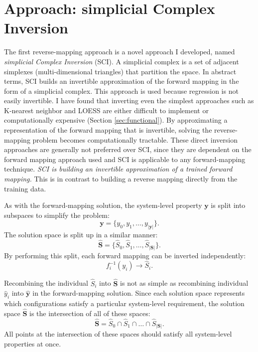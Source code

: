 \section{\fw Approach: simplicial Complex Inversion}
The first \fw reverse-mapping approach is a novel approach I developed, named \textit{simplicial Complex Inversion} (SCI).
A simplicial complex is a set of adjacent simplexes (multi-dimensional triangles) that partition the space.
In abstract terms, SCI builds an invertible approximation of the forward mapping in the form of a simplicial complex.
This approach is used because regression is not easily invertible.
I have found that inverting even the simplest approaches such as K-nearest neighbor and LOESS are either difficult to implement or computationally expensive (Section \ref{sec:functional}).
By approximating a representation of the forward mapping that is invertible, solving the reverse-mapping problem becomes computationally tractable.
These direct inversion approaches are generally not preferred over SCI, since they are dependent on the forward mapping approach used and SCI is applicable to any forward-mapping technique.
\textit{SCI is building an invertible approximation of a trained forward mapping.}
This is in contrast to building a reverse mapping directly from the training data.

As with the forward-mapping solution, the system-level property $\mathbf y$ is split into subspaces to simplify the problem:
\[ \mathbf y = \{y_0, y_1, \ldots, y_{|\mathbf y|}\}. \]
The solution space is split up in a similar manner:
\[ \hat{\mathbf S} = \{\hat S_0, \hat S_1, \ldots, \hat S_{|\mathbf S|}\}. \]
By performing this split, each forward mapping can be inverted independently:
\[ f^{-1}_i(y_i) \rightarrow \hat S_i. \]

Recombining the individual $\hat S_i$ into $\hat{\mathbf S}$ is not as simple as recombining individual $\hat y_i$ into $\hat{\mathbf y}$ in the forward-mapping solution.
Since each solution space represents which configurations satisfy a particular system-level requirement, the solution space $\hat{\mathbf S}$ is the intersection of all of these spaces:
\[ \hat{\mathbf S} = \hat S_0 \cap \hat S_1 \cap \ldots \cap \hat S_{|\mathbf S|}.\]
All points at the intersection of these spaces should satisfy all system-level properties at once.

